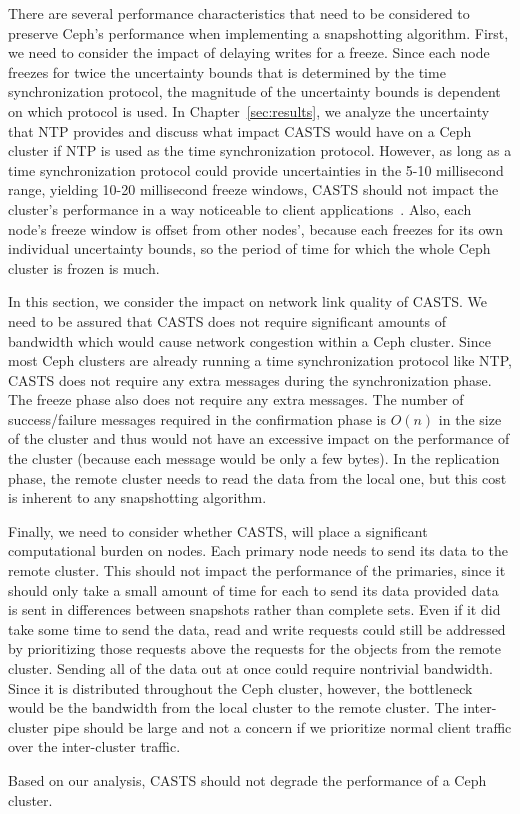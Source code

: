 There are several performance characteristics that need to be
considered to preserve Ceph's performance when implementing a
snapshotting algorithm. First, we need to consider the impact of
delaying writes for a freeze. Since each node freezes for twice the
uncertainty bounds that is determined by the time synchronization
protocol, the magnitude of the uncertainty bounds is dependent on
which protocol is used. In Chapter~\ref{sec:results}, we analyze the
uncertainty that NTP provides and discuss what impact CASTS would have
on a Ceph cluster if NTP is used as the time synchronization
protocol. However, as long as a time synchronization protocol could
provide uncertainties in the 5-10 millisecond range, yielding 10-20
millisecond freeze windows, CASTS should not impact the
cluster's performance in a way noticeable to client
applications~\citep{Sage}. Also, each node's freeze window is
offset from other nodes', because each freezes for its own individual
uncertainty bounds, so the period of time for which the whole Ceph cluster is
frozen is much.

In this section, we consider the impact on network link quality of
CASTS. We need to be assured that CASTS does not
require significant amounts of bandwidth which would cause network
congestion within a Ceph cluster. Since most Ceph clusters are already
running a time synchronization protocol like NTP, CASTS does
not require any extra messages during the synchronization phase. The
freeze phase also does not require any extra messages. The number of
success/failure messages required in the confirmation phase is $O(n)$
in the size of the cluster and thus would not have an excessive impact
on the performance of the cluster (because each message would be only
a few bytes). In the replication phase, the remote cluster needs to
read the data from the local one, but this cost is inherent to any
snapshotting algorithm.

Finally, we need to consider whether CASTS, will place a significant
computational burden on nodes. Each primary node needs to send its
data to the remote cluster. This should not impact the performance of
the primaries, since it should only take a small amount of time for
each to send its data provided data is sent in differences between
snapshots rather than complete sets. Even if it did take some time to
send the data, read and write requests could still be addressed by
prioritizing those requests above the requests for the objects from
the remote cluster. Sending all of the data out at once could require
nontrivial bandwidth. Since it is distributed throughout the Ceph
cluster, however, the bottleneck would be the bandwidth from the local
cluster to the remote cluster. The inter-cluster pipe should be
large and not a concern if we prioritize normal client traffic over
the inter-cluster traffic.

Based on our analysis, CASTS should not degrade the
performance of a Ceph cluster.
